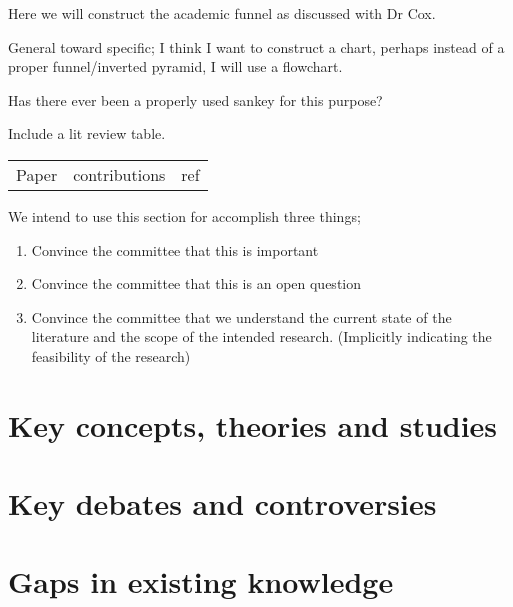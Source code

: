 
Here we will construct the academic funnel as discussed with Dr Cox.

General toward specific;
I think I want to construct a chart, perhaps instead of a proper
funnel/inverted pyramid, I will use a flowchart.

Has there ever been a properly used sankey for this purpose?


Include a lit review table.

\begin{tabular}{ccc}
    Paper & contributions & ref 
\end{tabular}

We intend to use this section for accomplish three things;
\begin{enumerate}
    \item Convince the committee that this is important
    \item Convince the committee that this is an open question
    \item Convince the committee that we understand the current state of the literature and the scope of the intended research. (Implicitly indicating the feasibility of the research)
\end{enumerate}

\section{Key concepts, theories and studies}
\section{Key debates and controversies}
\section{Gaps in existing knowledge}

